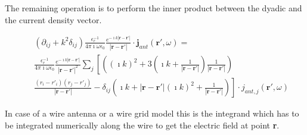 \documentclass[a4paper,11pt]{thesis}
\begin{document}
The remaining operation is to perform the inner product between the dyadic and the current density vector.

\begin{eqnarray}
&&\left(  \partial_{ij}   + k^2 \delta_{ij} \right) \frac{\epsilon_r^{-1}}{4 \pi \imath \omega \epsilon_0} \frac{e^{- \imath k  | \mathbf{r}-\mathbf{r'} |}}{| \mathbf{r}-\mathbf{r'} |}\cdot \mathbf{j}_{ant}(\mathbf{r'},\omega)=\label{isotropicelectricfield}\\
&&  \frac{\epsilon_r^{-1}}{4 \pi \imath \omega \epsilon_0} \frac{e^{- \imath k | \mathbf{r}-\mathbf{r'}|}}{| \mathbf{r}-\mathbf{r'}|^2} \sum_j \left[ \left( ( \imath k)^2+ 3 \left( \imath k + \frac{1}{| \mathbf{r}-\mathbf{r'}|} \right)\frac{1}{| \mathbf{r}-\mathbf{r'}|} \right) \right. \nonumber\\
&&\left.\frac{(r_i-r'_i)(r_j-r'_j)}{| \mathbf{r}-\mathbf{r'}|} -  \delta_{ij} \left(   \imath k+| \mathbf{r}-\mathbf{r'}|(\imath k)^2 + \frac{1}{| \mathbf{r}-\mathbf{r'}|}\right) \right]\cdot j_{ant,j}(\mathbf{r'},\omega)\nonumber
 \end{eqnarray}


In case of a wire antenna or a wire grid model this is the integrand which has to be integrated numerically along the wire to get the electric field at point \textbf{r}. %

\end{document}

